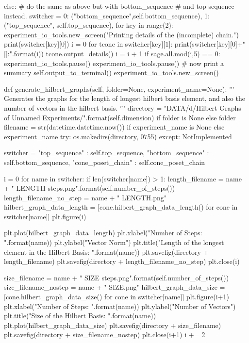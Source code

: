 \documentclass{TC}
\begin{document}
\begin{SAGE}
		else:
			# do the same as above but with bottom_sequence
			# and top sequence instead.
			switcher = {
				0: ("bottom_sequence",self.bottom_sequence),
				1: ("top_sequence", self.top_sequence),
			}
			for key in range(2):
				experiment_io_tools.new_screen("Printing details of the (incomplete) chain.")
				print(switcher[key][0])
				i = 0
				for tcone in switcher[key][1]:
					print(switcher[key][0]+"[{}]:".format(i))
					tcone.output_details()
					i = i + 1 
					if sage.all.mod(i,5) == 0:
						experiment_io_tools.pause()
				experiment_io_tools.pause()
		# now print a summary
		self.output_to_terminal()
		experiment_io_tools.new_screen()

	def generate_hilbert_graphs(self, folder=None, experiment_name=None):
		''' Generates the graphs for the length of longest hilbert basis element,
			and also the number of vectors in the hilbert basis.  
		'''
		directory = "DATA/{}d/Hilbert Graphs of Unnamed Experiments/".format(self.dimension) if folder is None else folder
		filename = str(datetime.datetime.now()) if experiment_name is None else experiment_name
		try:
			os.makedirs(directory, 0755) 
		except:
			NotImplemented



		switcher = {"top_sequence" : self.top_sequence,
					"bottom_sequence" : self.bottom_sequence,
					"cone_poset_chain" : self.cone_poset_chain}

		i = 0
		for name in switcher:
			if len(switcher[name]) > 1:
				length_filename = name + " LENGTH {} steps.png".format(self.number_of_steps())
				length_filename_no_step = name + " LENGTH.png"
				hilbert_graph_data_length = [cone.hilbert_graph_data_length() for cone in switcher[name]]
				plt.figure(i)
				
				plt.plot(hilbert_graph_data_length)
				plt.xlabel("Number of Steps: {}".format(name))
				plt.ylabel("Vector Norm")
				plt.title("Length of the longest element in the Hilbert Basis: {}".format(name))
				plt.savefig(directory + length_filename)
				plt.savefig(directory + length_filename_no_step)
				plt.close(i)

				size_filename = name + " SIZE {} steps.png".format(self.number_of_steps())
				size_filename_nostep = name + " SIZE.png"
				hilbert_graph_data_size = [cone.hilbert_graph_data_size() for cone in switcher[name]]
				plt.figure(i+1)
				plt.xlabel("Number of Steps: {}".format(name))
				plt.ylabel("Number of Vectors")
				plt.title("Size of the Hilbert Basis: {}".format(name))
				plt.plot(hilbert_graph_data_size)
				plt.savefig(directory + size_filename)
				plt.savefig(directory + size_filename_nostep)
				plt.close(i+1)
			i += 2



\end{SAGE}
\end{document}
